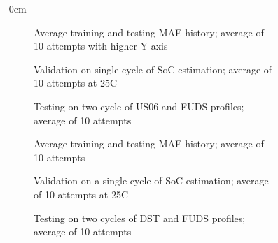 \begin{figure}[H]
    \centering
    \begin{adjustwidth}{-\extralength}{0cm}
    \begin{subfigure}[b]{0.425\textwidth}
        \centering
        
        \caption{Average training and testing MAE history; average of 10 attempts with higher Y-axis}
    \end{subfigure}
    \hfill
    \begin{subfigure}[b]{0.425\textwidth}
        \centering
        
        \caption{Validation on single cycle of SoC estimation; average of 10 attempts at 25\textdegree{}C}
    \end{subfigure}
    \hfill
    \begin{subfigure}[b]{0.425\textwidth}
        \centering
        
        \caption{Testing on two cycle of US06 and FUDS profiles; average of 10 attempts}
        \label{subfig:Model-5res-DSTvsFUDS}
    \end{subfigure}
    \begin{subfigure}[b]{0.425\textwidth}
        \centering
        
        \caption{Average training and testing MAE history; average of 10 attempts}
    \end{subfigure}
    \hfill
    \begin{subfigure}[b]{0.425\textwidth}
        \centering
        
        \caption{Validation on a single cycle of SoC estimation; average of 10 attempts at 25\textdegree{}C}
    \end{subfigure}
    \hfill
    \begin{subfigure}[b]{0.425\textwidth}
        \centering
        
        \caption{Testing on two cycles of DST and FUDS profiles; average of 10 attempts}
    \end{subfigure}
    \begin{subfigure}[b]{0.425\textwidth}
        \centering
        

\end{subfigure}
\end{adjustwidth}
\end{figure}
